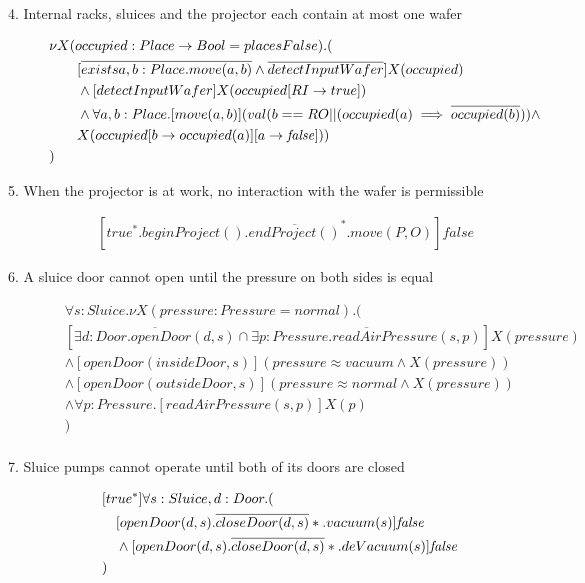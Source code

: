 \begin{description}
 
 \item[4. Internal racks, sluices and the projector each contain at most one wafer]
\begin{align*}
& \nu X(occupied:Place \to Bool=placesFalse).(\\
& \tab\tab [\overline{exists a,b:Place.move(a,b)} \wedge \overline{detectInputWafer}]X(occupied) \\
& \tab\tab \wedge [detectInputWafer]X(occupied[RI \to true]) \\
& \tab\tab \wedge \forall a,b:Place.[move(a,b)](val(b==RO || (occupied(a) \implies \overline{occupied(b)})) \wedge \\
& \tab\tab X(occupied[b \to occupied(a)][a \to \mathit{false}])) \\
& )
\end{align*}

 
 \item[5. When the projector is at work, no interaction with the wafer is permissible]
 	\begin{align*}
 		&[true^*.beginProject().\overline{endProject()}^*.move(P,O)]\mathit{false}
	\end{align*}
	
 \item[6. A sluice door cannot open until the pressure on both sides is equal]
	\begin{align*}
& \forall s: Sluice . \nu X(pressure: Pressure = normal) . ( \\
&   [\overline{\exists d: Door . openDoor(d, s)} \cap \overline{\exists p: Pressure . readAirPressure(s, p)}]X(pressure) \\
&   \wedge [openDoor(insideDoor, s)](pressure \approx vacuum \wedge X(pressure)) \\
&   \wedge [openDoor(outsideDoor, s)](pressure \approx normal \wedge X(pressure)) \\
&   \wedge \forall p: Pressure . [readAirPressure(s, p)]X(p) \\
& ) \\
	\end{align*}
	
 \item[7. Sluice pumps cannot operate until both of its doors are closed]
 
 \begin{align*}
 &[true^*]\forall s:Sluice, d:Door . ( \\
 &\hspace{1em} [openDoor(d,s).\overline{closeDoor(d,s)}*.vacuum(s)]\mathit{false} \\
 &\hspace{1em} \wedge [openDoor(d,s).\overline{closeDoor(d,s)}*.deVacuum(s)]\mathit{false} \\
 &)
 \end{align*}


\end{description}
